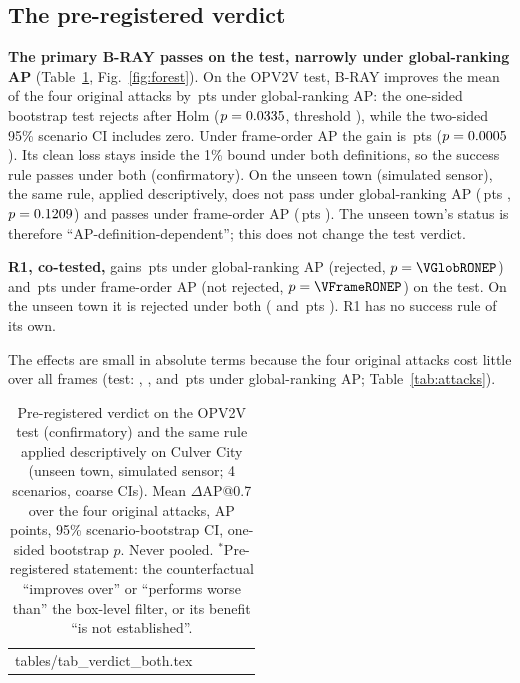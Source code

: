\documentclass[conference]{IEEEtran}
\makeatletter
\newcommand{\pts}{\,pts}
\newcommand{\Cul}{unseen town (simulated sensor)}
\newcommand{\tabin}[1]{\@@input #1 }
\makeatother
\begin{document}
\subsection{The pre-registered verdict}
\label{sec:verdict}
\textbf{The primary B-RAY passes on the test, narrowly under global-ranking AP} (Table~\ref{tab:verdict},
Fig.~\ref{fig:forest}). On the OPV2V test, B-RAY improves the mean of the four original attacks by
\VGlobBRAYDelta\pts{} under global-ranking AP: the one-sided bootstrap test rejects after Holm ($p=0.0335$,
threshold \VGlobBRAYHolmThr), while the two-sided 95\% scenario CI \VGlobBRAYCI{} includes zero. Under frame-order
AP the gain is \VFrameBRAYDelta\pts{} \VFrameBRAYCI{} ($p=0.0005$). Its clean loss stays inside the 1\%
bound under both definitions, so the success rule passes under both (confirmatory). On the \Cul, the same rule,
applied descriptively, does not pass under global-ranking AP (\CulHeadGlobBRAY\pts{} \CulHeadGlobBRAYCI,
$p=0.1209$) and passes under frame-order AP (\CulHeadFrameBRAY\pts{} \CulHeadFrameBRAYCI). The unseen
town's status is therefore ``AP-definition-dependent''; this does not change the test verdict.

\textbf{R1, co-tested,} gains \VGlobRONEDelta\pts{} \VGlobRONECI{} under global-ranking AP (rejected,
$p=\VGlobRONEP$) and \VFrameRONEDelta\pts{} \VFrameRONECI{} under frame-order AP (not rejected, $p=\VFrameRONEP$)
on the test. On the unseen town it is rejected under both (\CulHeadGlobRONE{} \CulHeadGlobRONECI{} and
\CulHeadFrameRONE\pts{} \CulHeadFrameRONECI). R1 has no success rule of its own.

The effects are small in absolute terms because the four original attacks cost little over all frames
(test: \LossGlobSpoofFeat, \LossGlobRemoveFeat, \LossGlobShiftFeat{} and \LossGlobSpoofPts\pts{} under global-ranking
AP; Table~\ref{tab:attacks}).

\begin{table}[!t]
\caption{Pre-registered verdict on the OPV2V test (confirmatory) and the same rule applied descriptively on
Culver City (unseen town, simulated sensor; 4 scenarios, coarse CIs). Mean $\Delta$AP@0.7 over the four original
attacks, AP points, 95\% scenario-bootstrap CI, one-sided bootstrap $p$. Never pooled. $^\ast$Pre-registered
statement: the counterfactual ``improves over'' or ``performs worse than'' the box-level filter, or its benefit
``is not established''.}
\label{tab:verdict}
\centering
\footnotesize
\setlength{\tabcolsep}{6pt}
\begin{tabular}{@{}lcccc@{}}
\toprule
\tabin{tables/tab_verdict_both.tex}
\bottomrule
\end{tabular}
\end{table}
\end{document}
